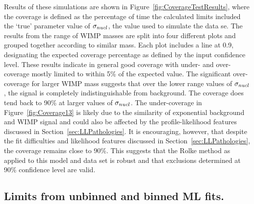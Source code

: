 Results of these simulations are shown in Figure~\ref{fig:CoverageTestResults}, where the coverage is defined as the percentage of time the calculated limits included the `true' parameter value of $\sigma_{nucl}$, the value used to simulate the data se.  The results from the range of WIMP masses are split into four different plots and grouped together according to similar mass.  Each plot includes a line at 0.9, designating the expected coverage percentage as defined by the input confidence level.  These results indicate in general good coverage with under- and over-coverage mostly limited to within 5\% of the expected value.  The significant over-coverage for larger WIMP mass suggests that over the lower range values of $\sigma_{nucl}$, the signal is completely indistinguishable from background.  The coverage does tend back to 90\% at larger values of $\sigma_{nucl}$.  The under-coverage in Figure~\ref{fig:Coverage13} is likely due to the similarity of exponential background and WIMP signal and could also be affected by the profile-likelihood features discussed in Section~\ref{sec:LLPathologies}.  It is encouraging, however, that despite the fit difficulties and likelihood features discussed in Section~\ref{sec:LLPathologies}, the coverage remains close to 90\%.  This suggests that the Rolke method as applied to this model and data set is robust and that exclusions determined at 90\% confidence level are valid.

		\subsection{Limits from unbinned and binned ML fits.}
		\label{sec:LimitsUnbinned}
			
